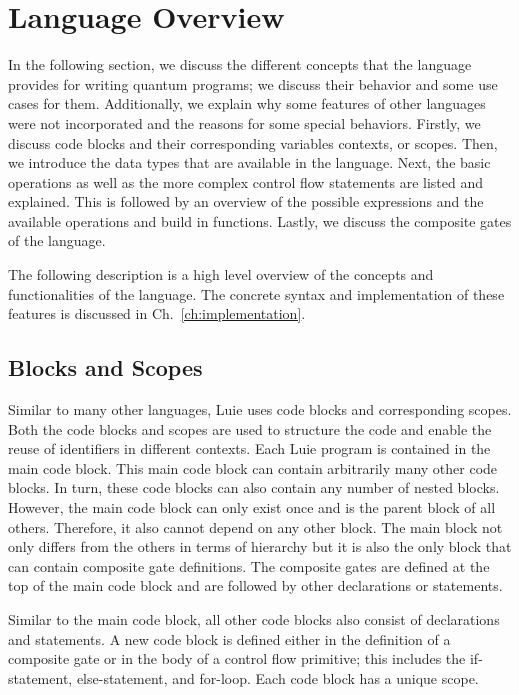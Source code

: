 \section{Language Overview}
In the following section, we discuss the different concepts that the language provides for writing quantum programs; we discuss their behavior and some use cases for them. Additionally, we explain why some features of other languages were not incorporated and the reasons for some special behaviors. Firstly, we discuss code blocks and their corresponding variables contexts, or scopes. Then, we introduce the data types that are available in the language. Next, the basic operations as well as the more complex control flow statements are listed and explained. This is followed by an overview of the possible expressions and the available operations and build in functions. Lastly, we discuss the composite gates of the language. 

The following description is a high level overview of the concepts and functionalities of the language. The concrete syntax and implementation of these features is discussed in Ch.~\ref{ch:implementation}.

\subsection{Blocks and Scopes}
\label{sec:concept_blocksAndScope}
Similar to many other languages, Luie uses code blocks and corresponding scopes. Both the code blocks and scopes are used to structure the code and enable the reuse of identifiers in different contexts. Each Luie program is contained in the main code block. This main code block can contain arbitrarily many other code blocks. In turn, these code blocks can also contain any number of nested blocks. However, the main code block can only exist once and is the parent block of all others. Therefore, it also cannot depend on any other block. The main block not only differs from the others in terms of hierarchy but it is also the only block that can contain composite gate definitions. The composite gates are defined at the top of the main code block and are followed by other declarations or statements. 

Similar to the main code block, all other code blocks also consist of declarations and statements. A new code block is defined either in the definition of a composite gate or in the body of a control flow primitive; this includes the if-statement, else-statement, and for-loop. Each code block has a unique scope.


